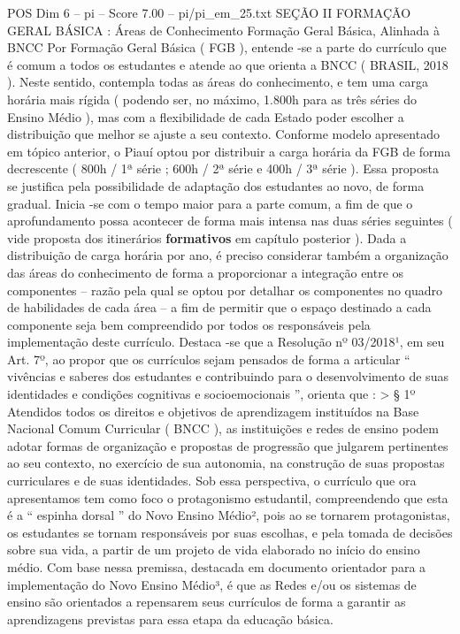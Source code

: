 \begin{textsample}{POS Dim 6 – pi – Score 7.00 – pi/pi\_em\_25.txt}  \label{ex:f6_pos_195}
SEÇÃO II FORMAÇÃO GERAL BÁSICA : Áreas de Conhecimento Formação Geral Básica, Alinhada à BNCC Por Formação Geral Básica ( FGB ), entende -se a parte do currículo que é comum a todos os estudantes e atende ao que orienta a BNCC ( BRASIL, 2018 ).
Neste sentido, contempla todas as áreas do conhecimento, e tem uma carga horária mais rígida ( podendo ser, no máximo, 1.800h para as três séries do Ensino Médio ), mas com a flexibilidade de cada Estado poder escolher a distribuição que melhor se ajuste a seu contexto.
Conforme modelo apresentado em tópico anterior, o Piauí optou por distribuir a carga horária da FGB de forma decrescente ( 800h / 1ª série ; 600h / 2ª série e 400h / 3ª série ).
Essa proposta se justifica pela possibilidade de adaptação dos estudantes ao novo, de forma gradual.
Inicia -se com o tempo maior para a parte comum, a fim de que o aprofundamento possa acontecer de forma mais intensa nas duas séries seguintes ( vide proposta dos itinerários \textbf{formativos} em capítulo posterior ).
Dada a distribuição de carga horária por ano, é preciso considerar também a organização das áreas do conhecimento de forma a proporcionar a integração entre os componentes – razão pela qual se optou por detalhar os componentes no quadro de habilidades de cada área – a fim de permitir que o espaço destinado a cada componente seja bem compreendido por todos os responsáveis pela implementação deste currículo.
Destaca -se que a Resolução nº 03/2018¹, em seu Art. 7º, ao propor que os currículos sejam pensados de forma a articular “ vivências e saberes dos estudantes e contribuindo para o desenvolvimento de suas identidades e condições cognitivas e socioemocionais ”, orienta que : > § 1º Atendidos todos os direitos e objetivos de aprendizagem instituídos na Base Nacional Comum Curricular ( BNCC ), as instituições e redes de ensino podem adotar formas de organização e propostas de progressão que julgarem pertinentes ao seu contexto, no exercício de sua autonomia, na construção de suas propostas curriculares e de suas identidades.
Sob essa perspectiva, o currículo que ora apresentamos tem como foco o protagonismo estudantil, compreendendo que esta é a “ espinha dorsal ” do Novo Ensino Médio², pois ao se tornarem protagonistas, os estudantes se tornam responsáveis por suas escolhas, e pela tomada de decisões sobre sua vida, a partir de um projeto de vida elaborado no início do ensino médio.
Com base nessa premissa, destacada em documento orientador para a implementação do Novo Ensino Médio³, é que as Redes e/ou os sistemas de ensino são orientados a repensarem seus currículos de forma a garantir as aprendizagens previstas para essa etapa da educação básica.

\end{textsample}

